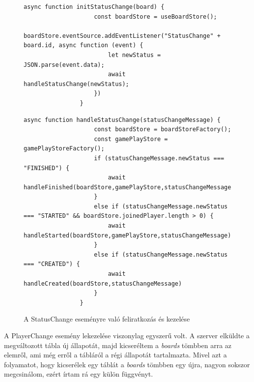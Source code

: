 \documentclass[a4paper,twoside]{article}
\begin{document}
\begin{figure}
	\caption{A StatusChange eseményre való feliratkozás és kezelése}
		\begin{minipage}{\textwidth}
			\begin{lstlisting}[style=javascriptStyle]
				async function initStatusChange(board) {
					const boardStore = useBoardStore();
					boardStore.eventSource.addEventListener("StatusChange" + board.id, async function (event) {
						let newStatus = JSON.parse(event.data);
						await handleStatusChange(newStatus);
					})
				}
			\end{lstlisting}
		\end{minipage}
		\begin{minipage}{\textwidth}
			\begin{lstlisting}[style=javascriptStyle]
				async function handleStatusChange(statusChangeMessage) {
					const boardStore = boardStoreFactory();
					const gamePlayStore = gamePlayStoreFactory();
					if (statusChangeMessage.newStatus === "FINISHED") {
						await handleFinished(boardStore,gamePlayStore,statusChangeMessage);
					}
					else if (statusChangeMessage.newStatus === "STARTED" && boardStore.joinedPlayer.length > 0) {
						await handleStarted(boardStore,gamePlayStore,statusChangeMessage)
					}
					else if (statusChangeMessage.newStatus === "CREATED") {
						await handleCreated(boardStore,statusChangeMessage)
					}
				}
			\end{lstlisting}
		\end{minipage}
	\label{statuschange}
\end{figure}

A PlayerChange esemény lekezelése viszonylag egyszerű volt. A szerver elküldte a megváltozott tábla új állapotát, majd kicseréltem a \textit{boards} tömbben arra az elemről, ami még erről a tábláról a régi állapotát tartalmazta. Mivel azt a folyamatot, hogy kicserélek egy táblát a \textit{boards} tömbben egy újra, nagyon sokszor megcsinálom, ezért írtam rá egy külön függvényt. 
\end{document}
